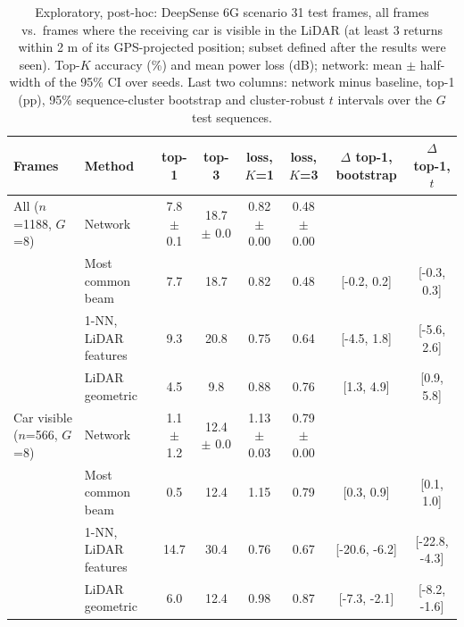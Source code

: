 \begin{table}[t]\centering\caption{Exploratory, post-hoc: DeepSense 6G scenario 31 test frames, all frames vs.\ frames where the receiving car is visible in the LiDAR (at least 3 returns within 2 m of its GPS-projected position; subset defined after the results were seen). Top-$K$ accuracy (\%) and mean power loss (dB); network: mean $\pm$ half-width of the 95\% CI over seeds. Last two columns: network minus baseline, top-1 (pp), 95\% sequence-cluster bootstrap and cluster-robust $t$ intervals over the $G$ test sequences.}\label{tab:realdata_visible}
\small\begin{tabular}{@{}llcccccc@{}}\toprule
Frames & Method & top-1 & top-3 & loss, $K$=1 & loss, $K$=3 & $\Delta$ top-1, bootstrap & $\Delta$ top-1, $t$ \\\midrule
All ($n$=1188, $G$=8) & Network & 7.8 $\pm$ 0.1 & 18.7 $\pm$ 0.0 & 0.82 $\pm$ 0.00 & 0.48 $\pm$ 0.00 & & \\
 & Most common beam & 7.7 & 18.7 & 0.82 & 0.48 & [-0.2, 0.2] & [-0.3, 0.3] \\
 & 1-NN, LiDAR features & 9.3 & 20.8 & 0.75 & 0.64 & [-4.5, 1.8] & [-5.6, 2.6] \\
 & LiDAR geometric & 4.5 & 9.8 & 0.88 & 0.76 & [1.3, 4.9] & [0.9, 5.8] \\
\midrule
Car visible ($n$=566, $G$=8) & Network & 1.1 $\pm$ 1.2 & 12.4 $\pm$ 0.0 & 1.13 $\pm$ 0.03 & 0.79 $\pm$ 0.00 & & \\
 & Most common beam & 0.5 & 12.4 & 1.15 & 0.79 & [0.3, 0.9] & [0.1, 1.0] \\
 & 1-NN, LiDAR features & 14.7 & 30.4 & 0.76 & 0.67 & [-20.6, -6.2] & [-22.8, -4.3] \\
 & LiDAR geometric & 6.0 & 12.4 & 0.98 & 0.87 & [-7.3, -2.1] & [-8.2, -1.6] \\
\bottomrule\end{tabular}\end{table}
